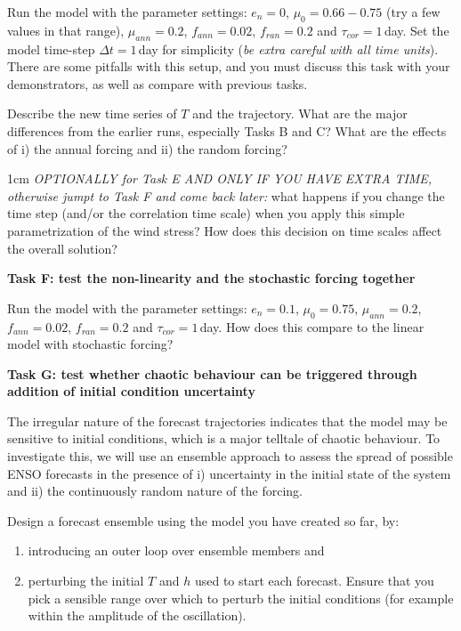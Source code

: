 \documentclass[11pt,a4paper]{article}
\begin{document}
Run the model with the parameter settings: $e_n=0$,
$\mu_0=0.66-0.75$ (try a few values in that range), $\mu_{ann}=0.2$, $f_{ann}=0.02$, $f_{ran}=0.2$ and
$\tau_{cor}=1\,$day. Set the model time-step $\Delta t =1\,$day for
simplicity (\emph{be extra careful with all time units}).  There are some pitfalls with this setup, and you must discuss this task with your demonstrators, as well as compare with previous tasks.

Describe the new time series of $T$ and the
trajectory. What are the major differences from the earlier runs, especially Tasks B and C? What
are the effects of i) the annual forcing and ii) the random forcing?

\begin{adjustwidth}{1cm}{}
\emph{OPTIONALLY for Task E AND ONLY IF YOU HAVE EXTRA TIME, otherwise jumpt to Task F and come back later:} what happens if you change the time step (and/or the correlation time scale) when you apply this simple parametrization of the wind stress? How does this decision on time scales affect the overall solution?
\end{adjustwidth}


{\large\bf Task F: test the non-linearity and the stochastic forcing together}

Run the model with the parameter settings: $e_n=0.1$,
$\mu_0=0.75$, $\mu_{ann}=0.2$, $f_{ann}=0.02$, $f_{ran}=0.2$ and
$\tau_{cor}=1\,$day.  How does this compare to the linear model with stochastic forcing?

{\large\bf Task G: test whether chaotic behaviour can be triggered through addition of initial condition uncertainty}

The irregular nature of the forecast trajectories indicates that the model may be sensitive to initial conditions, which is a major telltale of chaotic behaviour. To investigate this, we will use an ensemble approach to assess the spread of possible ENSO
forecasts in the presence of i) uncertainty in the initial state of the system and ii) 
the continuously random nature of the forcing. 

Design a forecast ensemble using the model you have created so far, by: 
\begin{enumerate}[label=(\alph*),noitemsep,topsep=0pt]
\item introducing an outer loop over ensemble members and 
\item perturbing the initial $T$ and $h$ used to start each forecast. Ensure that you pick a sensible range over which
to perturb the initial conditions (for example within the amplitude of
the oscillation). 
\end{enumerate}
\end{document}
